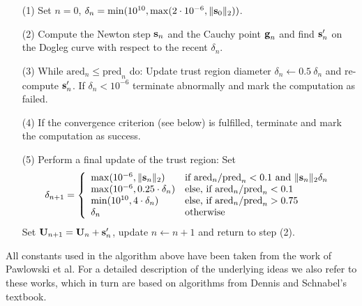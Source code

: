 \begin{itemize}
	\item[(1)] 
	Set $n=0$, $\delta_n = \min(10^{10}, \max(2 \cdot 10^{-6}, \| \textbf{s}_0 \|_2 ))$.
	
	\item[(2)]
	Compute the Newton step $\textbf{s}_n$ and the Cauchy point  $\textbf{g}_n$ and 
	find $\textbf{s}'_n$ on the Dogleg curve with respect to the recent $\delta_n$.
	
	\item[(3)]
	While $\textrm{ared}_n \leq \textrm{pred}_n$ do: 
	Update trust region diameter $\delta_n \leftarrow 0.5 \ \delta_n$
	and re-compute $\textbf{s}'_n$.
	If $\delta_n < 10^{-6}$ terminate abnormally and mark the computation as failed.
	
	\item[(4)]
	If the convergence criterion (see below) is fulfilled, terminate and mark the computation as success.
	
	\item[(5)] 
	Perform a final update of the trust region: Set
	\[
	\delta_{n+1} = \left\{ \begin{array}{ll}
	\max( 10^{-6}, \| \textbf{s}_n \|_2 )     &\text{if } \textrm{ared}_n / \textrm{pred}_n < 0.1 \text{ and } \| \textbf{s}_n \|_2 \delta_n \\
	\max( 10^{-6}, 0.25 \cdot \delta_n )        &\text{else, if } \textrm{ared}_n / \textrm{pred}_n < 0.1 \\
	\min( 10^{10}, 4 \cdot \delta_n )           &\text{else, if } \textrm{ared}_n / \textrm{pred}_n > 0.75 \\
	\delta_{n}                                  &\text{otherwise} \\
	\end{array} \right.
	\]
	Set $\textbf{U}_{n+1} = \textbf{U}_{n} + \textbf{s}'_{n} $, update $n \leftarrow n + 1$ and return to step (2).
	
\end{itemize}
All constants used in the algorithm above have been taken from the work of Pawlowski et al. \cite{pawlowskiGlobalizationTechniquesNewton2006}
For a detailed description of the underlying ideas we also refer to these works, 
which in turn are based on algorithms from Dennis and Schnabel's textbook. \cite{dennisNumericalMethodsUnconstrained1996}


